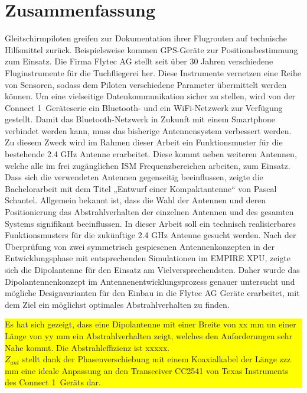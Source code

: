 \newpage
\section*{Zusammenfassung}

Gleitschirmpiloten greifen zur Dokumentation ihrer Flugrouten auf technische Hilfsmittel zurück. Beispielsweise kommen GPS-Geräte zur Positionsbestimmung zum Einsatz. Die Firma Flytec AG stellt seit über 30 Jahren verschiedene Fluginstrumente für die Tuchfliegerei her. Diese Instrumente vernetzen eine Reihe von Sensoren, sodass dem Piloten verschiedene Parameter übermittelt werden können. Um eine vielseitige Datenkommunikation sicher zu stellen, wird von der \glqq Connect 1\grqq \  Geräteserie ein Bluetooth- und ein WiFi-Netzwerk zur Verfügung gestellt. Damit das Bluetooth-Netzwerk in Zukunft mit einem Smartphone verbindet werden kann, muss das bisherige Antennensystem verbessert werden. Zu diesem Zweck wird im Rahmen dieser Arbeit ein Funktionsmuster für die bestehende 2.4 GHz Antenne erarbeitet. Diese kommt  neben weiteren Antennen, welche alle im frei zugänglichen ISM Frequenzbereichen arbeiten, zum Einsatz. Dass sich die verwendeten Antennen gegenseitig beeinflussen, zeigte die Bachelorarbeit mit dem Titel „Entwurf einer Kompaktantenne“ von Pascal Schantel.
Allgemein bekannt ist, dass die Wahl der Antennen und deren Positionierung das Abstrahlverhalten der einzelnen Antennen und des gesamten Systems signifikant beeinflussen. In dieser Arbeit soll ein technisch realisierbares Funktionsmusters für die zukünftige 2.4 GHz Antenne gesucht werden.  Nach der Überprüfung von zwei symmetrisch gespiesenen Antennenkonzepten in der Entwicklungsphase mit entsprechenden Simulationen im EMPIRE XPU, zeigte sich die Dipolantenne für den Einsatz am Vielversprechendsten. Daher wurde das Dipolantennenkonzept im Antennenentwicklungsprozess genauer untersucht und mögliche Designvarianten für den Einbau in die Flytec AG Geräte erarbeitet, mit dem Ziel ein möglichst optimales Abstrahlverhalten zu finden.\\
  \colorbox{yellow}{\parbox[t]{\textwidth}{Es hat sich gezeigt, dass eine Dipolantenne mit einer Breite von xx mm un einer Länge von yy mm 
   ein Abstrahlverhalten zeigt, welches den Anforderungen sehr Nahe kommt. 
   Die Abstrahleffizienz ist xxxxx.\\
   $Z_{ant}$ stellt dank der Phasenverschiebung  mit einem  Koaxialkabel der Länge zzz mm eine ideale Anpassung  an den Transceiver CC2541 von Texas Instruments des \glqq Connect 1\grqq  \ Geräts dar.}}\\


